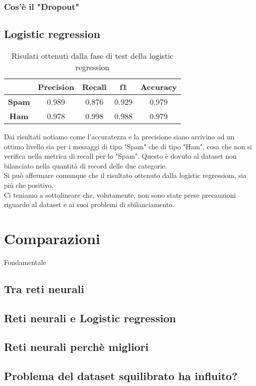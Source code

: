 \subsubsection{Cos'è il "Dropout"}
\subsection{Logistic regression}
\renewcommand{\arraystretch}{1.4}
\begin{table}[H]
	\begin{center}
		\begin{tabular}{|c|c|c|c|c|}
			\hline
			&\textbf{Precision} & \textbf{Recall} & \textbf{f1} & \textbf{Accuracy}\\ \hline
			\textbf{Spam} & 0.989  & 0.876 & 0.929 & 0.979 \\ \hline
			\textbf{Ham} & 0.978  & 0.998 & 0.988 & 0.979\\ \hline
		\end{tabular}
		\caption{Risulati ottenuti dalla fase di test della logistic regression\label{}}
	\end{center}
\end{table}
\renewcommand{\arraystretch}{1}
Dai risultati notiamo come l'accuratezza e la precisione siano arrivino ad un ottimo livello sia per i messaggi di tipo "Spam" che di tipo "Ham", cosa che non si verifica nella metrica di recall per lo "Spam". Questo è dovuto al dataset non bilanciato nella quantità di record delle due categorie. \\
Si può affermare comunque che il risultato ottenuto dalla logistic regressiom, sia più che positivo.\\
Ci teniamo a sottolineare che, volutamente, non sono state prese precauzioni riguardo al dataset e ai suoi problemi di sbilanciamento.
\section{Comparazioni}
Fondamentale 
\subsection{Tra reti neurali}
\subsection{Reti neurali e Logistic regression}
\subsection{Reti neurali perchè migliori}
\subsection{Problema del dataset squilibrato ha influito?}

